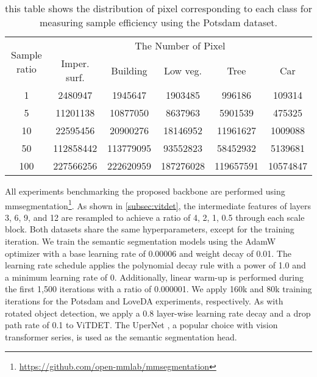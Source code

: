 \begin{table*}[ht]{\textwidth=0mm}
{\begin{tabular}{c | l | c c c c c | c | c }
    \end{tabular}
    }
    \label{tab:potsdam sample efficiency table}
\end{table*} \begin{table}[ht]
    \centering
    \caption{this table shows the distribution of pixel corresponding to each class for measuring sample efficiency using the Potsdam dataset.}
    \setlength{\tabcolsep}{2.75pt}
    \renewcommand{\arraystretch}{1.25}
    {
    \begin{tabular}{c|c c c c c}
        \hline
        \multirow{2}{*}{Sample ratio} & \multicolumn{5}{c}{The Number of Pixel} \\ \cline{2-6}
        & Imper. surf. & Building & Low veg. & Tree & Car \\ \hline

        1  & 2480947 & 1945647 & 1903485 & 996186 & 109314 \\ \hline
        5  & 11201138 & 10877050 & 8637963 & 5901539 & 475325 \\ \hline
        10  & 22595456 & 20900276 & 18146952 & 11961627 & 1009088 \\ \hline
        50  & 112858442 & 113779095 & 93552823 & 58452932 & 5139681 \\ \hline
        100  & 227566256 & 222620959 & 187276028 & 119657591 & 10574847 \\ \hline
        
    \end{tabular}
    }
    \label{tab:potsdam label ratio}
\end{table} 
All experiments benchmarking the proposed backbone are performed using mmsegmentation\footnote{\url{https://github.com/open-mmlab/mmsegmentation}}. As shown in \autoref{subsec:vitdet}, the intermediate features of layers 3, 6, 9, and 12 are resampled to achieve a ratio of 4, 2, 1, 0.5 through each scale block. Both datasets share the same hyperparameters, except for the training iteration. We train the semantic segmentation models using the AdamW optimizer with a base learning rate of 0.00006 and weight decay of 0.01. The learning rate schedule applies the polynomial decay rule with a power of 1.0 and a minimum learning rate of 0. Additionally, linear warm-up is performed during the first 1,500 iterations with a ratio of 0.000001. We apply 160k and 80k training iterations for the Potsdam and LoveDA experiments, respectively. As with rotated object detection, we apply a 0.8 layer-wise learning rate decay and a drop path rate of 0.1 to ViTDET. The UperNet \cite{xiao2018unified}, a popular choice with vision transformer series, is used as the semantic segmentation head.


